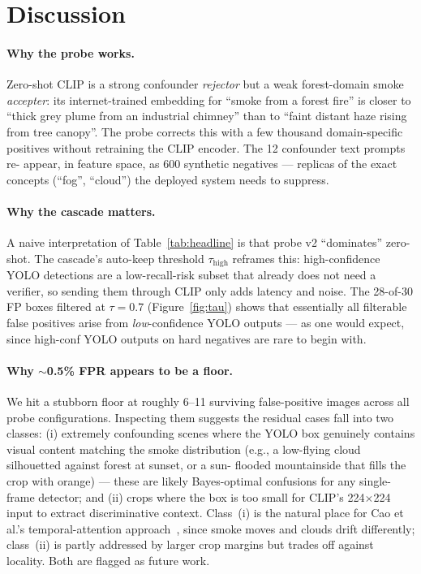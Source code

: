 \documentclass{article}
\begin{document}
\section{Discussion}
\label{sec:discussion}

\paragraph{Why the probe works.}
Zero-shot CLIP is a strong confounder \emph{rejector} but a weak
forest-domain smoke \emph{accepter}: its internet-trained embedding for
``smoke from a forest fire'' is closer to ``thick grey plume from an
industrial chimney'' than to ``faint distant haze rising from tree canopy''.
The probe corrects this with a few thousand domain-specific positives
without retraining the CLIP encoder. The 12 confounder text prompts re-
appear, in feature space, as 600 synthetic negatives --- replicas of the
exact concepts (``fog'', ``cloud'') the deployed system needs to suppress.

\paragraph{Why the cascade matters.}
A naive interpretation of Table~\ref{tab:headline} is that probe v2 ``dominates''
zero-shot. The cascade's auto-keep threshold $\tau_{\text{high}}$ reframes
this: high-confidence YOLO detections are a low-recall-risk subset that
already does not need a verifier, so sending them through CLIP only adds
latency and noise. The 28-of-30 FP boxes filtered at $\tau{=}0.7$
(Figure~\ref{fig:tau}) shows that essentially all filterable false positives
arise from \emph{low}-confidence YOLO outputs --- as one would expect, since
high-conf YOLO outputs on hard negatives are rare to begin with.

\paragraph{Why $\sim$0.5\% FPR appears to be a floor.}
We hit a stubborn floor at roughly 6--11 surviving false-positive images
across all probe configurations. Inspecting them suggests the residual cases
fall into two classes: (i) extremely confounding scenes where the YOLO box
genuinely contains visual content matching the smoke distribution
(e.g., a low-flying cloud silhouetted against forest at sunset, or a sun-
flooded mountainside that fills the crop with orange) --- these are likely
Bayes-optimal confusions for any single-frame detector; and (ii) crops where
the box is too small for CLIP's 224$\times$224 input to extract discriminative
context. Class~(i) is the natural place for Cao et al.'s temporal-attention
approach~\cite{bilstm_smoke}, since smoke moves and clouds drift differently;
class~(ii) is partly addressed by larger crop margins but trades off against
locality. Both are flagged as future work.
\end{document}
